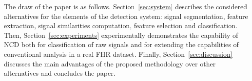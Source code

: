 
%
The draw of the paper is as follows. Section~\ref{sec:system} describes  the considered alternatives for the elements of the detection system: signal segmentation, feature extraction, signal similarities computation, feature selection and classification. Then, Section~\ref{sec:experiments} experimentally demonstrates the capability of NCD both for classification of raw signals and for extending the capabilities of conventional analysis in a real FHR dataset. Finally, Section~\ref{sec:discussion} discusses the main advantages of the proposed methodology over other alternatives and concludes the paper.